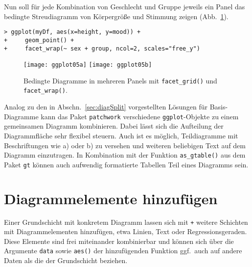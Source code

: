 Nun soll für jede Kombination von Geschlecht und Gruppe jeweils ein Panel das bedingte Streudiagramm von Körpergröße und Stimmung zeigen (Abb.\ \ref{fig:ggplot05}).
\begin{lstlisting}
> ggplot(myDf, aes(x=height, y=mood)) +
+     geom_point() +
+     facet_wrap(~ sex + group, ncol=2, scales="free_y")
\end{lstlisting}

\begin{figure}[ht]
\centering
\texttt{[image: ggplot05a]}
\texttt{[image: ggplot05b]}
\vspace*{-0.5em}
\caption{Bedingte Diagramme in mehreren Panels mit \lstinline!facet_grid()! und \lstinline!facet_wrap()!.}
\label{fig:ggplot05}
\end{figure}

Analog zu den in Abschn.\ \ref{sec:diagSplit} vorgestellten Lösungen für Basis-Diagramme kann das Paket  \lstinline!patchwork! \cite{Pedersen2019} verschiedene \lstinline!ggplot!-Objekte zu einem gemeinsamen Diagramm kombinieren. Dabei lässt sich die Aufteilung der Diagrammfläche sehr flexibel steuern. Auch ist es möglich, Teildiagramme mit Beschriftungen wie a) oder b) zu versehen und weiteren beliebigen Text auf dem Diagramm einzutragen. In Kombination mit der Funktion  \lstinline!as_gtable()! aus dem Paket  \lstinline!gt! können auch aufwendig formatierte Tabellen Teil eines Diagramms sein.

\section{Diagrammelemente hinzufügen}
\label{sec:ggplotAddElem}

Einer Grundschicht mit konkretem Diagramm lassen sich mit \lstinline!+! weitere Schichten mit Diagrammelementen hinzufügen, etwa Linien, Text oder Regressionsgeraden. Diese Elemente sind frei miteinander kombinierbar und können sich über die Argumente \lstinline!data! sowie \lstinline!aes()! der hinzufügenden Funktion ggf.\ auch auf andere Daten als die der Grundschicht beziehen.

